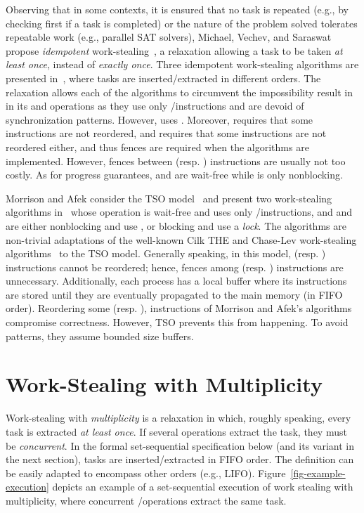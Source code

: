 Observing that in some contexts, it is ensured that no task is repeated (e.g., by checking first if a task is completed) or the nature of the problem solved tolerates repeatable work (e.g., parallel SAT solvers), Michael, Vechev, and Saraswat propose \emph{idempotent} work-stealing~\cite{maged.vechev.2009}, a relaxation allowing a task to be taken \emph{at least once}, instead of \emph{exactly once}. Three idempotent work-stealing algorithms are presented in~\cite{maged.vechev.2009}, where tasks are inserted/extracted in different orders. The relaxation allows each of the algorithms to circumvent the impossibility result in~\cite{DBLP_journals_jacm_AttiyaGHK09} in its \Put and \Take operations as they use only \R/\W instructions and are devoid of \RAW synchronization patterns. However, \Steal uses \CAS. Moreover, \Put requires that some \W instructions are not reordered, and \Steal requires that some \R instructions are not reordered either, and thus fences are required when the algorithms are implemented. However, fences between \R (resp. \W) instructions are usually not too costly. As for progress guarantees, \Put and \Take are wait-free while \Steal is only nonblocking.

Morrison and Afek consider the TSO model~\cite{DBLP_journals_cacm_SewellSONM10} and present two work-stealing algorithms in~\cite{fencefreework} whose \Put operation is wait-free and uses only \R/\W instructions,  and \Take and \Steal are either nonblocking and use \CAS, or blocking and use a \emph{lock}. The algorithms are non-trivial adaptations of the well-known Cilk THE and Chase-Lev work-stealing algorithms~\cite{circular.work.stealing, FLR98} to the TSO model. Generally speaking, in this model, \W (resp. \R) instructions cannot be reordered; hence, fences among \W (resp. \R) instructions are unnecessary. Additionally, each process has a local buffer where its \W instructions are stored until they are eventually propagated to the main memory (in FIFO order). Reordering some \W (resp. \R), instructions of Morrison and Afek's algorithms compromise correctness. However, TSO prevents this from happening. To avoid \RAW patterns, they assume bounded size \W buffers.

\section{\label{sec-ws-mult}Work-Stealing with Multiplicity}

Work-stealing with \emph{multiplicity} is a relaxation in which, roughly speaking, every task is extracted \emph{at least once}. If several operations extract the task, they must be \emph{concurrent}. In the formal set-sequential specification below (and its variant in the next section), tasks are inserted/extracted in FIFO order. The definition can be easily adapted to encompass other orders (e.g., LIFO). Figure~\ref{fig-example-execution} depicts an example of a set-sequential execution of work stealing with multiplicity, where concurrent \Take/\Steal operations extract the same task.

